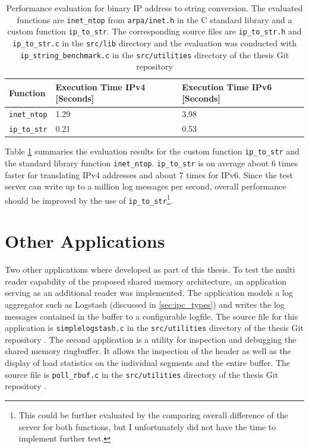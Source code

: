 \begin{table}[h!]
    \centering
    \small
    \begin{tabular}{lll}
        \toprule
        \textbf{Function} & \textbf{Execution Time IPv4 [Seconds]} & \textbf{Execution Time IPv6 [Seconds]} \\ \midrule 
        \texttt{inet\_ntop} & 1.29 & 3.98 \\ \midrule
        \texttt{ip\_to\_str} & 0.21 & 0.53 \\ 
        \bottomrule
    \end{tabular}
    \caption[IP String Conversion]{Performance evaluation for binary IP address to string conversion. The evaluated functions are
    \texttt{inet\_ntop} from \texttt{arpa/inet.h} in the C standard library and a custom function \texttt{ip\_to\_str}. The corresponding source 
    files are \texttt{ip\_to\_str.h}
    and \texttt{ip\_to\_str.c} in the \texttt{src/lib} directory and the evaluation was conducted with
    \texttt{ip\_string\_benchmark.c} in the \texttt{src/utilities} directory of the thesis Git repository \cite{gitlab}}
    \label{tab:ip_str}
\end{table}

Table \ref{tab:ip_str} summaries the evaluation results for the custom function \texttt{ip\_to\_str} and the standard library function \texttt{inet\_ntop}. 
\texttt{ip\_to\_str} is on average about 6 times faster for translating \ac{IPv4} addresses and about 7 times for \ac{IPv6}. Since the test server
can write up to a million log messages per second, overall performance should be improved by the use of \texttt{ip\_to\_str}\footnote{This could be further evaluated by the comparing overall difference of the server for both functions, but I unfortunately did not have the time to implement further test.}. 

\section{Other Applications}

Two other applications where developed as part of this thesis. To test the multi reader capability of the proposed
shared memory architecture, an application serving as an additional reader was implemented. The application models a 
log aggregator such as Logstash (discussed in \ref{sec:ipc_types}) and writes the log messages contained in the buffer to a configurable 
logfile. The source file for this application is \texttt{simplelogstash.c} in the \texttt{src/utilities} directory of the thesis Git repository \cite{gitlab}.
The second application is a utility for inspection and debugging the shared memory ringbuffer. It allows the inspection of the header as well
as the display of load statistics on the individual segments and the entire buffer. The source file is \texttt{poll\_rbuf.c} in the \texttt{src/utilities} directory of the thesis Git repository \cite{gitlab}. 


